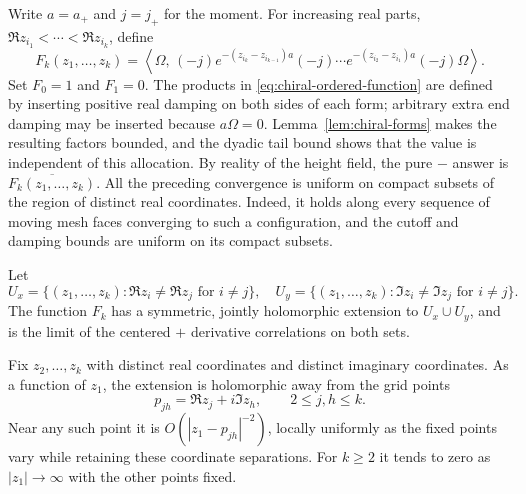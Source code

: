 Write $a=a_+$ and $j=j_+$ for the moment. For increasing real parts,
$\Re z_{i_1}<\cdots<\Re z_{i_k}$, define
\begin{equation}\label{eq:chiral-ordered-function}
 F_k(z_1,\ldots,z_k)
 =\left\langle\Omega,\,
 (-j)e^{-(z_{i_k}-z_{i_{k-1}})a}(-j)\cdots
 e^{-(z_{i_2}-z_{i_1})a}(-j)\Omega\right\rangle.
\end{equation}
Set $F_0=1$ and $F_1=0$. The products in
\eqref{eq:chiral-ordered-function} are defined by inserting positive
real damping on both sides of each form; arbitrary extra end damping
may be inserted because $a\Omega=0$. Lemma~\ref{lem:chiral-forms}
makes the resulting factors bounded, and the dyadic tail bound shows
that the value is independent of this allocation. By reality of the
height field, the pure $-$ answer is $\overline{F_k(z_1,\ldots,z_k)}$.
All the preceding convergence is uniform on compact subsets of the
region of distinct real coordinates. Indeed, it holds along every
sequence of moving mesh faces converging to such a configuration,
and the cutoff and damping bounds are uniform on its compact subsets.

\begin{lemma}\label{lem:chiral-holomorphy}
Let
\[
 U_x=\{(z_1,\ldots,z_k):\Re z_i\ne\Re z_j\text{ for }i\ne j\},
 \quad
 U_y=\{(z_1,\ldots,z_k):\Im z_i\ne\Im z_j\text{ for }i\ne j\}.
\]
The function $F_k$ has a symmetric, jointly holomorphic extension to
$U_x\cup U_y$, and is the limit of the centered $+$ derivative
correlations on both sets.

Fix $z_2,\ldots,z_k$ with distinct real coordinates and distinct imaginary
coordinates. As a function of $z_1$, the extension is holomorphic away
from the grid points
\begin{equation}\label{eq:chiral-grid-points}
                    p_{jh}=\Re z_j+i\Im z_h,\qquad 2\le j,h\le k.
\end{equation}
Near any such point it is $O(|z_1-p_{jh}|^{-2})$, locally uniformly
as the fixed points vary while retaining these coordinate separations.
For $k\ge2$ it tends to zero as $|z_1|\to\infty$ with the other points fixed.
\end{lemma}

